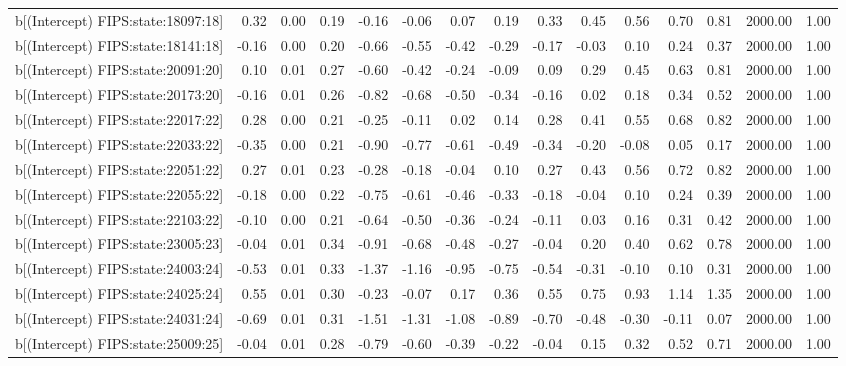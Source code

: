 \begin{table}[ht]
\begin{tabular}{rrrrrrrrrrrrrrr}
  b[(Intercept) FIPS:state:18097:18] & 0.32 & 0.00 & 0.19 & -0.16 & -0.06 & 0.07 & 0.19 & 0.33 & 0.45 & 0.56 & 0.70 & 0.81 & 2000.00 & 1.00 \\ 
  b[(Intercept) FIPS:state:18141:18] & -0.16 & 0.00 & 0.20 & -0.66 & -0.55 & -0.42 & -0.29 & -0.17 & -0.03 & 0.10 & 0.24 & 0.37 & 2000.00 & 1.00 \\ 
  b[(Intercept) FIPS:state:20091:20] & 0.10 & 0.01 & 0.27 & -0.60 & -0.42 & -0.24 & -0.09 & 0.09 & 0.29 & 0.45 & 0.63 & 0.81 & 2000.00 & 1.00 \\ 
  b[(Intercept) FIPS:state:20173:20] & -0.16 & 0.01 & 0.26 & -0.82 & -0.68 & -0.50 & -0.34 & -0.16 & 0.02 & 0.18 & 0.34 & 0.52 & 2000.00 & 1.00 \\ 
  b[(Intercept) FIPS:state:22017:22] & 0.28 & 0.00 & 0.21 & -0.25 & -0.11 & 0.02 & 0.14 & 0.28 & 0.41 & 0.55 & 0.68 & 0.82 & 2000.00 & 1.00 \\ 
  b[(Intercept) FIPS:state:22033:22] & -0.35 & 0.00 & 0.21 & -0.90 & -0.77 & -0.61 & -0.49 & -0.34 & -0.20 & -0.08 & 0.05 & 0.17 & 2000.00 & 1.00 \\ 
  b[(Intercept) FIPS:state:22051:22] & 0.27 & 0.01 & 0.23 & -0.28 & -0.18 & -0.04 & 0.10 & 0.27 & 0.43 & 0.56 & 0.72 & 0.82 & 2000.00 & 1.00 \\ 
  b[(Intercept) FIPS:state:22055:22] & -0.18 & 0.00 & 0.22 & -0.75 & -0.61 & -0.46 & -0.33 & -0.18 & -0.04 & 0.10 & 0.24 & 0.39 & 2000.00 & 1.00 \\ 
  b[(Intercept) FIPS:state:22103:22] & -0.10 & 0.00 & 0.21 & -0.64 & -0.50 & -0.36 & -0.24 & -0.11 & 0.03 & 0.16 & 0.31 & 0.42 & 2000.00 & 1.00 \\ 
  b[(Intercept) FIPS:state:23005:23] & -0.04 & 0.01 & 0.34 & -0.91 & -0.68 & -0.48 & -0.27 & -0.04 & 0.20 & 0.40 & 0.62 & 0.78 & 2000.00 & 1.00 \\ 
  b[(Intercept) FIPS:state:24003:24] & -0.53 & 0.01 & 0.33 & -1.37 & -1.16 & -0.95 & -0.75 & -0.54 & -0.31 & -0.10 & 0.10 & 0.31 & 2000.00 & 1.00 \\ 
  b[(Intercept) FIPS:state:24025:24] & 0.55 & 0.01 & 0.30 & -0.23 & -0.07 & 0.17 & 0.36 & 0.55 & 0.75 & 0.93 & 1.14 & 1.35 & 2000.00 & 1.00 \\ 
  b[(Intercept) FIPS:state:24031:24] & -0.69 & 0.01 & 0.31 & -1.51 & -1.31 & -1.08 & -0.89 & -0.70 & -0.48 & -0.30 & -0.11 & 0.07 & 2000.00 & 1.00 \\ 
  b[(Intercept) FIPS:state:25009:25] & -0.04 & 0.01 & 0.28 & -0.79 & -0.60 & -0.39 & -0.22 & -0.04 & 0.15 & 0.32 & 0.52 & 0.71 & 2000.00 & 1.00 \\ 

\end{tabular}
\end{table}
